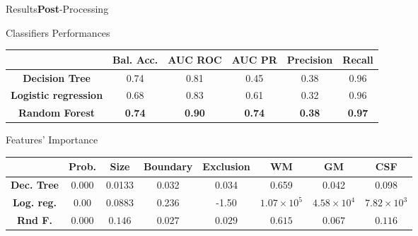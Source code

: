 \documentclass[]{standalone}
\begin{document}
	\begin{frame}{Results}{\textbf{Post}-Processing}
	\vspace{-28pt}
	\begin{exampleblock}{Classifiers Performances}
	\begin{table}[h!]
		\centering
		\setlength{\tabcolsep}{2pt}
		\small
		\begin{tabular}{c|ccccc}
		 & \textbf{Bal. Acc.} & \textbf{AUC ROC} & \textbf{AUC PR} & \textbf{Precision} & \textbf{Recall} \\ \hline
		\textbf{Decision Tree}       & 0.74 & 0.81 & 0.45 & 0.38 & 0.96 \\
		\textbf{Logistic regression} & 0.68 & 0.83 & 0.61 & 0.32 & 0.96 \\
		\textbf{Random Forest}       & \textbf{0.74} & \textbf{0.90} & \textbf{0.74} & \textbf{0.38} & \textbf{0.97}
		\end{tabular}
	\end{table}
	\end{exampleblock}
	
	\begin{alertblock}{Features' Importance}
	\begin{table}[h!]
		\centering
		\footnotesize
		\setlength\tabcolsep{2pt}
		\begin{tabular}{c|ccccccc}
				& \textbf{Prob.}     & \textbf{Size}        & \textbf{Boundary}     & \textbf{Exclusion} & \textbf{WM}       & \textbf{GM}        & \textbf{CSF}       \\ \hline
		\textbf{Dec. Tree} & 0.000 & 0.0133 & 0.032 & 0.034 & 0.659 & 0.042 & 0.098 \\
		\textbf{Log. reg.} & 0.00 & $0.0883$ & 0.236 & -1.50 & $1.07 \times 10^5 $ & $4.58 \times 10^4$ & $7.82 \times 10^3$ \\
		\textbf{Rnd F.} & $0.000$ & $0.146$ & $0.027$ & $0.029$  & $0.615$ & $0.067$ & $0.116$
		\end{tabular}
		\end{table}


	\vspace{-10pt}
	\end{alertblock}

	\end{frame}
\end{document}
